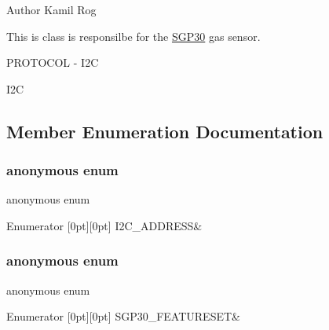 \begin{DoxyAuthor}{Author}
Kamil Rog
\end{DoxyAuthor}
This is class is responsilbe for the \hyperlink{classSGP30}{S\+G\+P30} gas sensor.

P\+R\+O\+T\+O\+C\+OL -\/ I2C

I2C 

\subsection{Member Enumeration Documentation}
\mbox{\label{classSGP30_a5b752e81e00059c22c039ab0fa2021d0}} 
\subsubsection{\texorpdfstring{anonymous enum}{anonymous enum}}
{\footnotesize\ttfamily anonymous enum\hspace{0.3cm}{\ttfamily [private]}}

\begin{DoxyEnumFields}{Enumerator}
[0pt][0pt]{}\mbox{\label{classSGP30_a5b752e81e00059c22c039ab0fa2021d0a509dbee04dff24f01fb2c7892703a3bd}} 
I2\+C\+\_\+\+A\+D\+D\+R\+E\+SS&\\
\hline

\end{DoxyEnumFields}
\mbox{\label{classSGP30_a2729a6a324c09b992fbfc46fc4bfed66}} 
\subsubsection{\texorpdfstring{anonymous enum}{anonymous enum}}
{\footnotesize\ttfamily anonymous enum\hspace{0.3cm}{\ttfamily [private]}}

\begin{DoxyEnumFields}{Enumerator}
[0pt][0pt]{}\mbox{\label{classSGP30_a2729a6a324c09b992fbfc46fc4bfed66ae33bc9477a75eb531e3868a02ef79c78}} 
S\+G\+P30\+\_\+\+F\+E\+A\+T\+U\+R\+E\+S\+ET&\\
\hline

\end{DoxyEnumFields}
\mbox{\label{classSGP30_a1d3a484196d7d31bf7d4210b410bb760}} 
